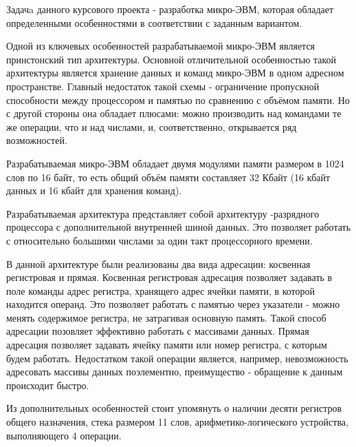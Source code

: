 \label{sec:intro}

Задачa данного курсового проекта - разработка микро-ЭВМ, которая обладает определенными особенностями в соответствии с заданным вариантом.

Одной из ключевых особенностей разрабатываемой микро-ЭВМ является принстонский тип архитектуры. Основной отличительной особенностью такой архитектуры является хранение данных и команд микро-ЭВМ в одном адресном пространстве.
Главный недостаток такой схемы - ограничение пропускной способности между процессором и памятью по сравнению с объёмом памяти.
Но с другой стороны она обладает плюсами: можно производить над командами те же операции, что и над числами, и, соответственно, открывается ряд возможностей.

Разрабатываемая микро-ЭВМ обладает двумя модулями памяти размером в 1024 слов по 16 байт, то есть общий объём памяти составляет 32 Кбайт (16 кбайт данных и 16 кбайт для хранения команд).

Разрабатываемая архитектура представляет собой архитектуру -разрядного процессора с дополнительной внутренней шиной данных. Это позволяет работать с относительно большими числами за один такт процессорного времени.

В данной архитектуре были реализованы два вида адресации: косвенная регистровая и прямая.
Косвенная регистровая адресация позволяет задавать в поле команды адрес регистра, хранящего адрес ячейки памяти, в которой находится операнд.
Это позволяет работать с памятью через указатели - можно менять содержимое регистра, не затрагивая основную память.
Такой способ адресации позовляет эффективно работать с массивами данных.
Прямая адресация позволяет задавать ячейку памяти или номер регистра, с которым будем работать. Недостатком такой операции является, например, невозможность адресовать массивы данных поэлементно, преимущество - обращение к данным происходит быстро.

Из дополнительных особенностей стоит упомянуть о наличии десяти регистров общего назначения, стека размером 11 слов, арифметико-логического устройства, выполняющего 4 операции.
